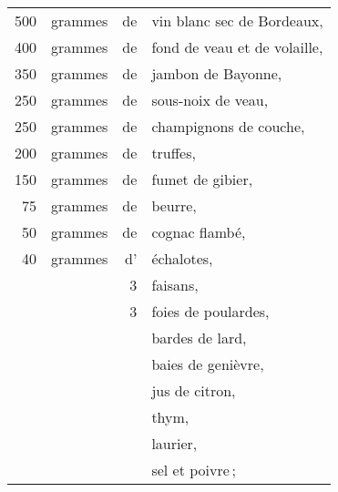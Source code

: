 \footnotesize
\begin{longtable}{rrrp{16em}}
    500 & grammes & de & vin blanc sec de Bordeaux,                                                       \\
    400 & grammes & de & fond de veau et de volaille,                                                     \\
    350 & grammes & de & jambon de Bayonne,                                                               \\
    250 & grammes & de & sous-noix de veau,                                                               \\
    250 & grammes & de & champignons de couche,                                                           \\
    200 & grammes & de & truffes,                                                                         \\
    150 & grammes & de & fumet de gibier,                                                                 \\
     75 & grammes & de & beurre,                                                                          \\
     50 & grammes & de & cognac flambé,                                                                   \\
     40 & grammes & d' & échalotes,                                                                       \\
        &         & 3  & faisans,                                                                         \\
        &         & 3  & foies de poulardes,                                                              \\
        &         &    & bardes de lard,                                                                  \\
        &         &    & baies de genièvre,                                                               \\
        &         &    & jus de citron,                                                                   \\
        &         &    & thym,                                                                            \\
        &         &    & laurier,                                                                         \\
        &         &    & sel et poivre ;                                                                  \\
\end{longtable}
\normalsize

